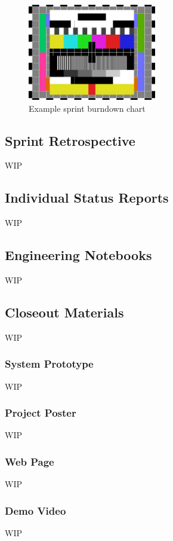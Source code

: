 \begin{figure}[h!]
    \centering
    \includegraphics[width=0.5\textwidth]{images/test_image}
    \caption{Example sprint burndown chart}
\end{figure}

\subsection{Sprint Retrospective}
WIP

\subsection{Individual Status Reports}
WIP

\subsection{Engineering Notebooks}
WIP

\subsection{Closeout Materials}
WIP

\subsubsection{System Prototype}
WIP

\subsubsection{Project Poster}
WIP

\subsubsection{Web Page}
WIP

\subsubsection{Demo Video}
WIP

